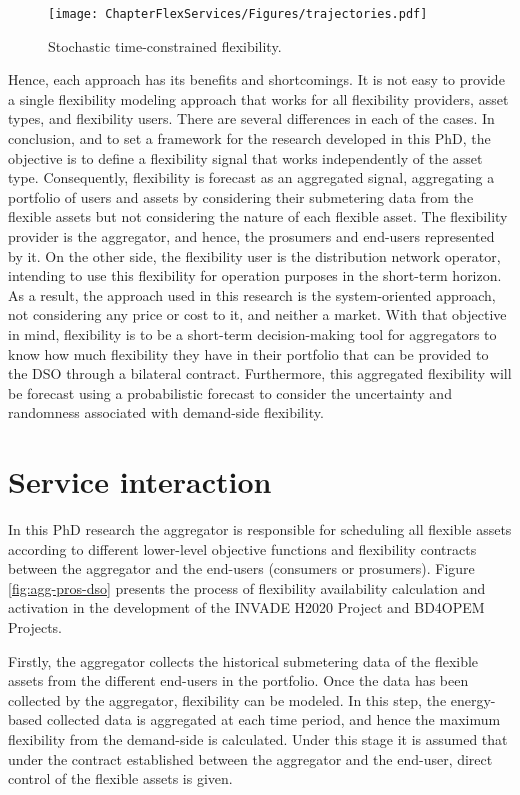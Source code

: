 \begin{figure}[htbp]
	\centering
	\texttt{[image: ChapterFlexServices/Figures/trajectories.pdf]}
		\caption{Stochastic time-constrained flexibility.}
	\label{fig:system}  
\end{figure}

Hence, each approach has its benefits and shortcomings. It is not easy to provide a single flexibility modeling approach that works for all flexibility providers, asset types, and flexibility users. There are several differences in each of the cases. In conclusion, and to set a framework for the research developed in this PhD, the objective is to define a flexibility signal that works independently of the asset type. Consequently, flexibility is forecast as an aggregated signal, aggregating a portfolio of users and assets by considering their submetering data from the flexible assets but not considering the nature of each flexible asset. 
The flexibility provider is the aggregator, and hence, the prosumers and end-users represented by it. On the other side, the flexibility user is the distribution network operator, intending to use this flexibility for operation purposes in the short-term horizon. As a result, the approach used in this research is the system-oriented approach, not considering any price or cost to it, and neither a market. With that objective in mind, flexibility is to be a short-term decision-making tool for aggregators to know how much flexibility they have in their portfolio that can be provided to the DSO through a bilateral contract. Furthermore, this aggregated flexibility will be forecast using a probabilistic forecast to consider the uncertainty and randomness associated with demand-side flexibility. 

\section{Service interaction}

In this PhD research the aggregator is responsible for scheduling all flexible assets according to different lower-level objective functions and flexibility contracts between the aggregator and the end-users (consumers or prosumers). Figure \ref{fig:agg-pros-dso} presents the process of flexibility availability calculation and activation in the development of the INVADE H2020 Project and BD4OPEM Projects. 

Firstly, the aggregator collects the historical submetering data of the flexible assets from the different end-users in the portfolio. Once the data has been collected by the aggregator, flexibility can be modeled. In this step, the energy-based collected data is aggregated at each time period, and hence the maximum flexibility from the demand-side is calculated. Under this stage it is assumed that under the contract established between the aggregator and the end-user, direct control of the flexible assets is given. 

